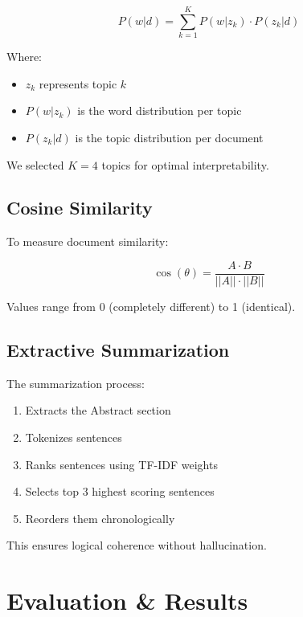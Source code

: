 \documentclass[12pt]{article}
\begin{document}
\begin{equation}
P(w|d) = \sum_{k=1}^{K} P(w|z_k) \cdot P(z_k|d)
\end{equation}

Where:
\begin{itemize}
    \item $z_k$ represents topic $k$
    \item $P(w|z_k)$ is the word distribution per topic
    \item $P(z_k|d)$ is the topic distribution per document
\end{itemize}

We selected $K = 4$ topics for optimal interpretability.

\subsection{Cosine Similarity}

To measure document similarity:

\begin{equation}
\cos(\theta) = \frac{A \cdot B}{||A|| \cdot ||B||}
\end{equation}

Values range from 0 (completely different) to 1 (identical).

\subsection{Extractive Summarization}

The summarization process:
\begin{enumerate}
    \item Extracts the Abstract section
    \item Tokenizes sentences
    \item Ranks sentences using TF-IDF weights
    \item Selects top 3 highest scoring sentences
    \item Reorders them chronologically
\end{enumerate}

This ensures logical coherence without hallucination.

\section{Evaluation \& Results}
\end{document}
